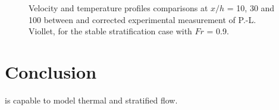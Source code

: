 \begin{figure}[H]
\centering
\begin{minipage}[t]{.45\textwidth}
 \centering
{}
\end{minipage}
\begin{minipage}[t]{.45\textwidth}
 \centering
{}
\end{minipage}
\begin{minipage}[t]{.45\textwidth}
 \centering
{}
\end{minipage}
\begin{minipage}[t]{.45\textwidth}
 \centering
{}
\end{minipage}
\begin{minipage}[t]{.45\textwidth}
 \centering
{}
\end{minipage}
\begin{minipage}[t]{.45\textwidth}
 \centering
{}
\end{minipage}
 \caption{Velocity and temperature profiles comparisons at $x/h$ = 10, 30 and 100 between  and corrected experimental measurement of P.-L. Viollet, for the stable stratification case with $Fr$ = 0.9.}
 \label{fig:Viollet:velo_temp_profiles}
\end{figure}

\section{Conclusion}

 is capable to model thermal and stratified flow.
